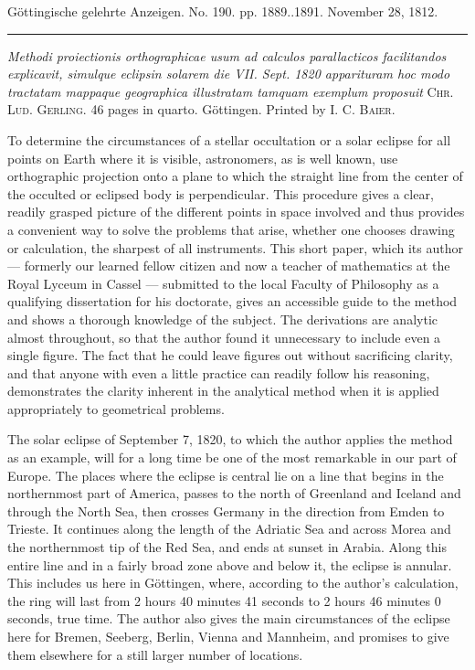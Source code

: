 \clearpage
{}
\hypertarget{native-547-lower}{}\label{native-547-lower}
\begin{center}\small Göttingische gelehrte Anzeigen. No. 190. pp. 1889..1891. November 28, 1812.\\[3pt]\rule{.72\linewidth}{.3pt}\end{center}

\emph{Methodi proiectionis orthographicae usum ad calculos parallacticos facilitandos explicavit, simulque eclipsin solarem die VII. Sept. \textup{1820} apparituram hoc modo tractatam mappaque geographica illustratam tamquam exemplum proposuit} \textsc{Chr. Lud. Gerling}. 46 pages in quarto. Göttingen. Printed by \textsc{I. C. Baier}.

To determine the circumstances of a stellar occultation or a solar eclipse for all points on Earth where it is visible, astronomers, as is well known, use orthographic projection onto a plane to which the straight line from the center of the occulted or eclipsed body is perpendicular. This procedure gives a clear, readily grasped picture of the different points in space involved and thus provides a convenient way to solve the problems that arise, whether one chooses drawing or calculation, the sharpest of all instruments. This short paper, which its author --- formerly our learned fellow citizen and now a teacher of mathematics at the Royal Lyceum in Cassel --- submitted to the local Faculty of Philosophy as a qualifying dissertation for his doctorate, gives an accessible guide to the method and shows a thorough knowledge of the subject. The derivations are analytic almost throughout, so that the author found it unnecessary to include even a single figure. The fact that he could leave figures out without sacrificing clarity, and that anyone with even a little practice can readily follow his reasoning, demonstrates the clarity inherent in the analytical method when it is applied appropriately to geometrical problems.

The solar eclipse of September 7, 1820, to which the author applies the method as an example, will for a long time be one of the most remarkable in our part of Europe. The places where the eclipse is central lie on a line that begins in the northernmost part of America, passes to the north of Greenland and Iceland and through the North Sea, then crosses Germany in the direction from Emden to Trieste. It continues along the length of the Adriatic Sea and across Morea and the northernmost tip of the Red Sea, and ends at sunset in Arabia. Along this entire line and in a fairly broad zone above and below it, the eclipse is annular. This includes us here in Göttingen, where, according to the author's calculation, the ring will last from 2 hours 40 minutes 41 seconds to 2 hours 46 minutes 0 seconds, true time. The author also gives the main circumstances of the eclipse here for Bremen, Seeberg, Berlin, Vienna and Mannheim, and promises to give them elsewhere for a still larger number of locations.
